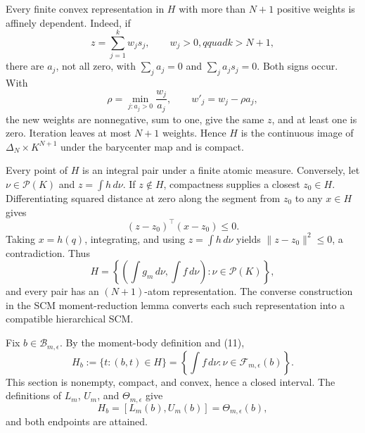 Every finite convex representation in \(H\) with more than \(N+1\) positive weights is affinely dependent.  Indeed, if
\[
 z=\sum_{j=1}^kw_js_j,\qquad w_j>0,qquad k>N+1,
\]
there are \(a_j\), not all zero, with \(\sum_ja_j=0\) and \(\sum_ja_js_j=0\).  Both signs occur.  With
\[
 \rho=\min_{j:a_j>0}\frac{w_j}{a_j},
 \qquad w'_j=w_j-\rho a_j,
\tag{9}
\]
the new weights are nonnegative, sum to one, give the same \(z\), and at least one is zero.  Iteration leaves at most \(N+1\) weights.  Hence \(H\) is the continuous image of \(\Delta_N\times K^{N+1}\) under the barycenter map and is compact.

Every point of \(H\) is an integral pair under a finite atomic measure.  Conversely, let \(\nu\in\mathcal P(K)\) and \(z=\int h\,d\nu\).  If \(z\notin H\), compactness supplies a closest \(z_0\in H\).  Differentiating squared distance at zero along the segment from \(z_0\) to any \(x\in H\) gives
\[
 (z-z_0)^{\top}(x-z_0)\leq0.
\tag{10}
\]
Taking \(x=h(q)\), integrating, and using \(z=\int h\,d\nu\) yields \(\lVert z-z_0\rVert^2\leq0\), a contradiction.  Thus
\[
 H=\left\{\left(\int g_m\,d\nu,\int f\,d\nu\right):\nu\in\mathcal P(K)\right\},
\tag{11}
\]
and every pair has an \((N+1)\)-atom representation.  The converse construction in the SCM moment-reduction lemma converts each such representation into a compatible hierarchical SCM.

Fix \(b\in\mathcal B_{m,\epsilon}\).  By the moment-body definition and (11),
\[
 H_b:=\{t:(b,t)\in H\}
 =\left\{\int f\,d\nu:\nu\in\mathcal F_{m,\epsilon}(b)\right\}.
\tag{12}
\]
This section is nonempty, compact, and convex, hence a closed interval.  The definitions of \(L_m\), \(U_m\), and \(\Theta_{m,\epsilon}\) give
\[
 H_b=[L_m(b),U_m(b)]=\Theta_{m,\epsilon}(b),
\tag{13}
\]
and both endpoints are attained.

